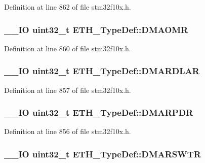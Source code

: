 Definition at line 862 of file stm32f10x.\-h.

\hypertarget{struct_e_t_h___type_def_a28b3943a7ad7db88c59a5f690446eacd}{
\subsubsection[{D\-M\-A\-O\-M\-R}]{\setlength{\rightskip}{0pt plus 5cm}\-\_\-\-\_\-\-I\-O {\bf uint32\-\_\-t} E\-T\-H\-\_\-\-Type\-Def\-::\-D\-M\-A\-O\-M\-R}}\label{struct_e_t_h___type_def_a28b3943a7ad7db88c59a5f690446eacd}


Definition at line 860 of file stm32f10x.\-h.

\hypertarget{struct_e_t_h___type_def_a46aafb9acbd753c23f89a9f57b68b64f}{
\subsubsection[{D\-M\-A\-R\-D\-L\-A\-R}]{\setlength{\rightskip}{0pt plus 5cm}\-\_\-\-\_\-\-I\-O {\bf uint32\-\_\-t} E\-T\-H\-\_\-\-Type\-Def\-::\-D\-M\-A\-R\-D\-L\-A\-R}}\label{struct_e_t_h___type_def_a46aafb9acbd753c23f89a9f57b68b64f}


Definition at line 857 of file stm32f10x.\-h.

\hypertarget{struct_e_t_h___type_def_aedb2e74c294ffed25c952b17e5bc0fc4}{
\subsubsection[{D\-M\-A\-R\-P\-D\-R}]{\setlength{\rightskip}{0pt plus 5cm}\-\_\-\-\_\-\-I\-O {\bf uint32\-\_\-t} E\-T\-H\-\_\-\-Type\-Def\-::\-D\-M\-A\-R\-P\-D\-R}}\label{struct_e_t_h___type_def_aedb2e74c294ffed25c952b17e5bc0fc4}


Definition at line 856 of file stm32f10x.\-h.

\hypertarget{struct_e_t_h___type_def_a2dd103ceba1159cefa4307bc31786640}{
\subsubsection[{D\-M\-A\-R\-S\-W\-T\-R}]{\setlength{\rightskip}{0pt plus 5cm}\-\_\-\-\_\-\-I\-O {\bf uint32\-\_\-t} E\-T\-H\-\_\-\-Type\-Def\-::\-D\-M\-A\-R\-S\-W\-T\-R}}\label{struct_e_t_h___type_def_a2dd103ceba1159cefa4307bc31786640}


